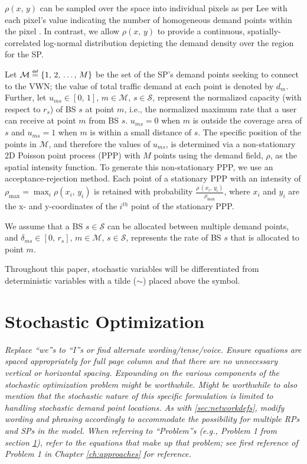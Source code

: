 \documentclass[12pt,dvips]{report}
\newcommand\myeq{\mathrel{\overset{\makebox[0pt]{\mbox{\normalfont\tiny\sffamily def}}}{=}}}
\begin{document}
$\rho\left(x,\, y\right)$ can be sampled over the space into individual pixels as per Lee with each pixel's value indicating the number of homogeneous demand points within the pixel \cite{6554749}.  In contrast, we allow $\rho\left(x,\, y\right)$ to provide a continuous, spatially-correlated log-normal distribution depicting the demand density over the region for the SP.

Let $\mathcal{M} \myeq \{1,\, 2,\, \ldots,\, M\}$ be the set of the SP's demand points seeking to connect to the VWN; the value of total traffic demand at each point is denoted by $d_m$.  Further, let $u_{ms} \in [0,\, 1],\, m \in \mathcal{M},\, s \in \mathcal{S}$, represent the normalized capacity (with respect to $r_s$) of BS $s$ at point $m$, i.e., the normalized maximum rate that a user can receive at point $m$ from BS $s$.  $u_{ms} = 0$ when $m$ is outside the coverage area of $s$ and $u_{ms} = 1$ when $m$ is within a small distance of $s$.  The specific position of the points in $\mathcal{M}$, and therefore the values of $u_{ms}$, is determined via a non-stationary 2D Poisson point process (PPP) with $M$ points using the demand field, $\rho$, as the spatial intensity function.  To generate this non-stationary PPP, we use an acceptance-rejection method.  Each point of a stationary PPP with an intensity of $\rho_{\max} = \max_i\rho\left(x_i,\, y_i\right)$ is retained with probability $\frac{\rho\,\left(x_i,\, y_i\right)}{\rho_{\max}}$, where $x_i$ and $y_i$ are the x- and y-coordinates of the $i^{th}$ point of the stationary PPP.

We assume that a BS $s \in \mathcal{S}$ can be allocated between multiple demand points, and $\delta_{ms} \in [0,\, r_s],\, m \in \mathcal{M},\, s \in \mathcal{S}$, represents the rate of BS $s$ that is allocated to point $m$.

Throughout this paper, stochastic variables will be differentiated from deterministic variables with a tilde ($\sim$) placed above the symbol.

\section{Stochastic Optimization} \label{sec:stochopt}

\textit{Replace ``we''s to ``I''s or find alternate wording/tense/voice.  Ensure equations are spaced appropriately for full page column and that there are no unnecessary vertical or horizontal spacing.  Expounding on the various components of the stochastic optimization problem might be worthwhile.  Might be worthwhile to also mention that the stochastic nature of this specific formulation is limited to handling stochastic demand point locations.  As with \ref{sec:networkdefs}, modify wording and phrasing accordingly to accommodate the possibility for multiple RPs and SPs in the model.  When referring to ``Problem''s (e.g., Problem 1 from section \ref{sec:stochopt}), refer to the equations that make up that problem; see first reference of  Problem 1 in Chapter \ref{ch:approaches} for reference.}
\end{document}
